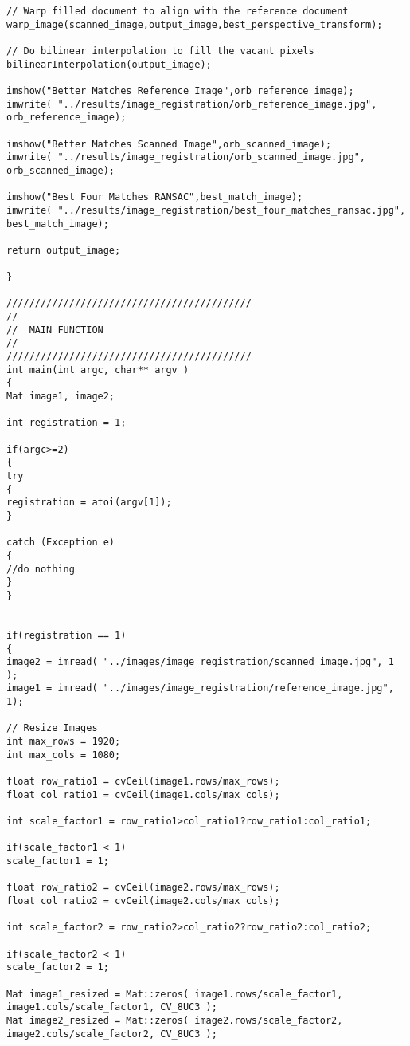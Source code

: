 \begin{lstlisting}
// Warp filled document to align with the reference document
warp_image(scanned_image,output_image,best_perspective_transform);

// Do bilinear interpolation to fill the vacant pixels
bilinearInterpolation(output_image);

imshow("Better Matches Reference Image",orb_reference_image);
imwrite( "../results/image_registration/orb_reference_image.jpg", orb_reference_image);

imshow("Better Matches Scanned Image",orb_scanned_image);
imwrite( "../results/image_registration/orb_scanned_image.jpg", orb_scanned_image);

imshow("Best Four Matches RANSAC",best_match_image);
imwrite( "../results/image_registration/best_four_matches_ransac.jpg", best_match_image);

return output_image;

}

///////////////////////////////////////////
//
//	MAIN FUNCTION
//
///////////////////////////////////////////
int main(int argc, char** argv )
{
Mat image1, image2;

int registration = 1;

if(argc>=2)
{
try
{
registration = atoi(argv[1]);
}

catch (Exception e)
{
//do nothing
}
}


if(registration == 1)
{
image2 = imread( "../images/image_registration/scanned_image.jpg", 1 );
image1 = imread( "../images/image_registration/reference_image.jpg", 1);

// Resize Images
int max_rows = 1920;
int max_cols = 1080;

float row_ratio1 = cvCeil(image1.rows/max_rows);
float col_ratio1 = cvCeil(image1.cols/max_cols);

int scale_factor1 = row_ratio1>col_ratio1?row_ratio1:col_ratio1;

if(scale_factor1 < 1)
scale_factor1 = 1;

float row_ratio2 = cvCeil(image2.rows/max_rows);
float col_ratio2 = cvCeil(image2.cols/max_cols);

int scale_factor2 = row_ratio2>col_ratio2?row_ratio2:col_ratio2;

if(scale_factor2 < 1)
scale_factor2 = 1;

Mat image1_resized = Mat::zeros( image1.rows/scale_factor1, image1.cols/scale_factor1, CV_8UC3 );
Mat image2_resized = Mat::zeros( image2.rows/scale_factor2, image2.cols/scale_factor2, CV_8UC3 );


\end{lstlisting}
